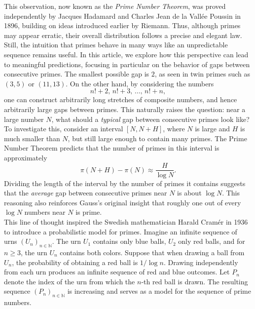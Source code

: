 \documentclass[11pt, reqno]{article}
\begin{document}
This observation, now known as the \emph{Prime Number Theorem}, was proved independently by Jacques Hadamard and Charles Jean de la Vall\'ee Poussin in 1896, building on ideas introduced earlier by Riemann. Thus, although primes may appear erratic, their overall distribution follows a precise and elegant law. \\

Still, the intuition that primes behave in many ways like an unpredictable sequence remains useful. In this article, we explore how this perspective can lead to meaningful predictions, focusing in particular on the behavior of gaps between consecutive primes. The smallest possible gap is $2$, as seen in twin primes such as $(3,5)$ or $(11,13)$. On the other hand, by considering the numbers
\[
n!+2,\, n!+3,\, \dots,\, n!+n,
\]
one can construct arbitrarily long stretches of composite numbers, and hence arbitrarily large gaps between primes. This naturally raises the question: near a large number $N$, what should a \emph{typical} gap between consecutive primes look like? \\

To investigate this, consider an interval $[N, N+H]$, where $N$ is large and $H$ is much smaller than $N$, but still large enough to contain many primes. The Prime Number Theorem predicts that the number of primes in this interval is approximately
\[
\pi(N+H) - \pi(N) \approx \frac{H}{\log N}.
\]
Dividing the length of the interval by the number of primes it contains suggests that the \emph{average} gap between consecutive primes near $N$ is about $\log N$. This reasoning also reinforces Gauss’s original insight that roughly one out of every $\log N$ numbers near $N$ is prime. \\

This line of thought inspired the Swedish mathematician Harald Cram\'er in 1936 to introduce a probabilistic model for primes. Imagine an infinite sequence of urns $(U_n)_{n\in\mathbb{N}}$. The urn $U_1$ contains only blue balls, $U_2$ only red balls, and for $n\ge3$, the urn $U_n$ contains both colors. Suppose that when drawing a ball from $U_n$, the probability of obtaining a red ball is $1/\log n$. Drawing independently from each urn produces an infinite sequence of red and blue outcomes. Let $P_n$ denote the index of the urn from which the $n$-th red ball is drawn. The resulting sequence $(P_n)_{n\in\mathbb{N}}$ is increasing and serves as a model for the sequence of prime numbers. \\
\end{document}

